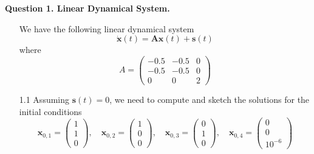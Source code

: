\documentclass[12pt]{article}
\begin{document}
\noindent


\noindent\textbf{Question 1. Linear Dynamical System.}
\begin{enumerate}
\item[]We have the following linear dynamical system 
\[
    \dot{\mathbf{x}}(t) = \mathbf{Ax}(t) + \mathbf{s}(t)
\]
where
$$A = \begin{pmatrix}
    -0.5 & -0.5 & 0\\
    -0.5 & -0.5 & 0\\
        0 &    0 & 2
\end{pmatrix}$$
\item[1.1] Assuming $\mathbf{s}(t)=0$, we need to compute and sketch the solutions for the initial conditions
\[
    \mathbf{x}_{0,1} = \begin{pmatrix} 1\\ 1\\ 0 \end{pmatrix}, \quad 
    \mathbf{x}_{0,2} = \begin{pmatrix} 1\\ 0\\ 0 \end{pmatrix}, \quad
    \mathbf{x}_{0,3} = \begin{pmatrix} 0\\ 1\\ 0 \end{pmatrix}, \quad
    \mathbf{x}_{0,4} = \begin{pmatrix} 0\\ 0\\ 10^{-6} \end{pmatrix}
\]


\end{enumerate}
\end{document}
